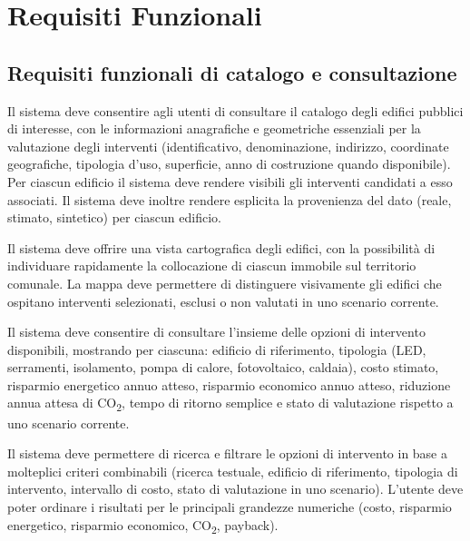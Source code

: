 \section{Requisiti Funzionali}

\subsection{Requisiti funzionali di catalogo e consultazione}

 \label{rf:catalogo_edifici}
Il sistema deve consentire agli utenti di consultare il catalogo degli edifici pubblici di interesse, con le informazioni anagrafiche e geometriche essenziali per la valutazione degli interventi (identificativo, denominazione, indirizzo, coordinate geografiche, tipologia d'uso, superficie, anno di costruzione quando disponibile). Per ciascun edificio il sistema deve rendere visibili gli interventi candidati a esso associati. Il sistema deve inoltre rendere esplicita la provenienza del dato (reale, stimato, sintetico) per ciascun edificio.

 \label{rf:mappa}
Il sistema deve offrire una vista cartografica degli edifici, con la possibilità di individuare rapidamente la collocazione di ciascun immobile sul territorio comunale. La mappa deve permettere di distinguere visivamente gli edifici che ospitano interventi selezionati, esclusi o non valutati in uno scenario corrente.

 \label{rf:catalogo_interventi}
Il sistema deve consentire di consultare l'insieme delle opzioni di intervento disponibili, mostrando per ciascuna: edificio di riferimento, tipologia (LED, serramenti, isolamento, pompa di calore, fotovoltaico, caldaia), costo stimato, risparmio energetico annuo atteso, risparmio economico annuo atteso, riduzione annua attesa di CO\textsubscript{2}, tempo di ritorno semplice e stato di valutazione rispetto a uno scenario corrente.

 \label{rf:filtri_interventi}
Il sistema deve permettere di ricerca e filtrare le opzioni di intervento in base a molteplici criteri combinabili (ricerca testuale, edificio di riferimento, tipologia di intervento, intervallo di costo, stato di valutazione in uno scenario). L'utente deve poter ordinare i risultati per le principali grandezze numeriche (costo, risparmio energetico, risparmio economico, CO\textsubscript{2}, payback).

